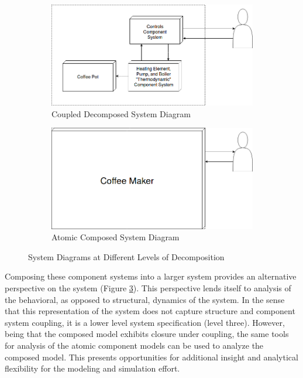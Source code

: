 \documentclass[10pt]{article}
\begin{document}
\begin{center}
  \begin{figure}[H]
    \begin{subfigure}{.5\textwidth}
      \centering
      \includegraphics[width=.8\linewidth]{input/Decomposed_v04}
      \caption{Coupled Decomposed System Diagram}
      \label{fig:sysSpeDia}
    \end{subfigure}%
    \begin{subfigure}{.5\textwidth}
      \centering
      \includegraphics[width=.8\linewidth]{input/Composed_v04}
      \caption{Atomic Composed System Diagram}
      \label{fig:comSysDia}
    \end{subfigure}
  \caption{System Diagrams at Different Levels of Decomposition}
  \end{figure}
\end{center}

Composing these component systems into a larger system provides an alternative perspective on the system (Figure \ref{fig:comSysDia}).  This perspective lends itself to analysis of the behavioral, as opposed to structural, dynamics of the system. In the sense that this representation of the system does not capture structure and component system coupling, it is a lower level system specification (level three).  However, being that the composed model exhibits closure under coupling, the same tools for analysis of the atomic component models can be used to analyze the composed model.  This presents opportunities for additional insight and analytical flexibility for the modeling and simulation effort.
\end{document}
